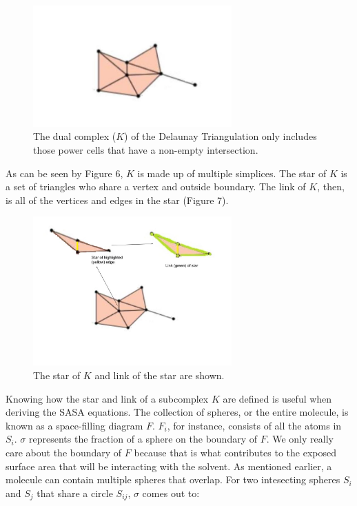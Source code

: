 \documentclass{article}
\begin{document}
\begin{figure}[h!]
\caption{The dual complex ($K$) of the Delaunay Triangulation only includes those power cells that have a non-empty intersection.\cite{Bryant}}
\centerline{\includegraphics[width=3in]{Figure9}}
\end{figure}

As can be seen by Figure 6, $K$ is made up of multiple simplices. The star of $K$ is a set of triangles who share a vertex and outside boundary. The link of $K$, then, is all of the vertices and edges in the star (Figure 7).

\begin{figure}[h!]
\caption{The star of $K$ and link of the star are shown.\cite{Bryant}}
\centerline{\includegraphics[width=3in]{Figure5}}
\end{figure}

Knowing how the star and link of a subcomplex $K$ are defined is useful when deriving the SASA equations.
The collection of spheres, or the entire molecule, is known as a space-filling diagram $F$. $F_i$, for instance, consists of all the atoms in $S_i$. $\sigma$ represents the fraction of a sphere on the boundary of $F$. We only really care about the boundary of $F$ because that is what contributes to the exposed surface area that will be interacting with the solvent. As mentioned earlier, a molecule can contain multiple spheres that overlap. For two intesecting spheres $S_i$ and $S_j$ that share a circle $S_{ij}$, $\sigma$ comes out to:
\end{document}
